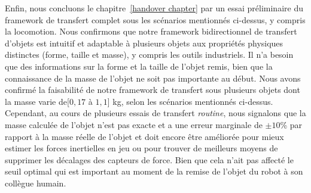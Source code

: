
Enfin, nous concluons le chapitre~\ref{handover chapter} par un essai préliminaire du framework de transfert complet sous les scénarios mentionnés ci-dessus, y compris la locomotion. Nous confirmons que notre framework bidirectionnel de transfert d'objets est intuitif et adaptable à plusieurs objets aux propriétés physiques distinctes (forme, taille et masse), y compris les outils industriels. Il n'a besoin que des informations sur la forme et la taille de l'objet remis, bien que la connaissance de la masse de l'objet ne soit pas importante au début. Nous avons confirmé la faisabilité de notre framework de transfert sous plusieurs objets dont la masse varie de[$0,17 $ à $ 1,1 $] kg, selon les scénarios mentionnés ci-dessus. Cependant, au cours de plusieurs essais de transfert \textit{routine}, nous signalons que la masse calculée de l'objet n'est pas exacte et a une erreur marginale de $ \pm10 $\% par rapport à la masse réelle de l'objet et doit encore être améliorée pour mieux estimer les forces inertielles en jeu ou pour trouver de meilleurs moyens de supprimer les décalages des capteurs de force. Bien que cela n'ait pas affecté le seuil optimal qui est important au moment de la remise de l'objet du robot à son collègue humain.




